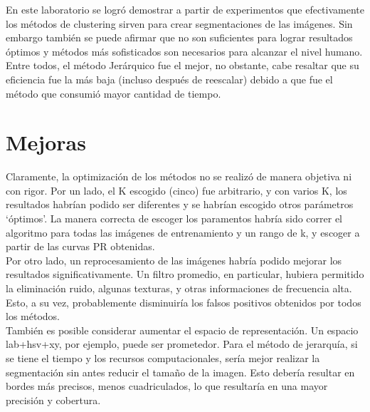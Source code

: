 \documentclass[10pt,twocolumn,letterpaper]{article}
\begin{document}
En este laboratorio se logró demostrar a partir de experimentos que efectivamente los métodos de clustering sirven para crear segmentaciones de las imágenes. Sin embargo también se puede afirmar que no son suficientes para lograr resultados óptimos y métodos más sofisticados son necesarios para alcanzar el nivel humano.  Entre todos, el método Jerárquico fue el mejor, no obstante, cabe resaltar que su eficiencia fue la más baja (incluso después de reescalar) debido a que fue el método que consumió mayor cantidad de tiempo. 

\section{Mejoras}
Claramente, la optimización de los métodos no se realizó de manera objetiva ni con rigor. Por un lado, el K escogido (cinco) fue arbitrario, y con varios K, los resultados habrían podido ser diferentes y se habrían escogido otros parámetros ‘óptimos’. La manera correcta de escoger los paramentos habría sido correr el algoritmo para todas las imágenes de entrenamiento y un rango de k, y escoger a partir de las curvas PR obtenidas.
\\
Por otro lado, un reprocesamiento de las imágenes habría podido mejorar los resultados significativamente. Un filtro promedio, en particular, hubiera permitido la eliminación ruido, algunas texturas, y otras informaciones de frecuencia alta. Esto, a su vez, probablemente disminuiría los falsos positivos obtenidos por todos los métodos.
\\
También es posible considerar aumentar el espacio de representación. Un espacio lab+hsv+xy, por ejemplo, puede ser prometedor. Para el método de jerarquía, si se tiene el tiempo y los recursos computacionales, sería mejor realizar la segmentación sin antes reducir el tamaño de la imagen. Esto debería resultar en bordes más precisos, menos cuadriculados, lo que resultaría en una mayor precisión y cobertura.


{\small


}
\end{document}
